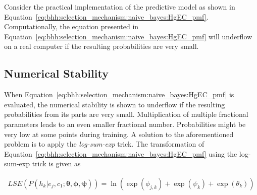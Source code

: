 \documentclass[preprint,review,12pt]{elsarticle}
\begin{document}
Consider the practical implementation of the predictive model as shown in Equation~\eqref{eq:bhh:selection_mechanism:naive_bayes:HgEC_pmf}. Computationally, the equation presented in Equation~\eqref{eq:bhh:selection_mechanism:naive_bayes:HgEC_pmf} will underflow on a real computer if the resulting probabilities are very small.

\subsection{Numerical Stability}\label{sec:bhh:selection_mechanism:numerical_stability}

When Equation~\eqref{eq:bhh:selection_mechanism:naive_bayes:HgEC_pmf} is evaluated, the numerical stability is shown to underflow if the resulting probabilities from its parts are very small. Multiplication of multiple fractional parameters leads to an even smaller fractional number. Probabilities might be very low at some points during training. A solution to the aforementioned problem is to apply the \textit{log-sum-exp} trick. The transformation of Equation~\eqref{eq:bhh:selection_mechanism:naive_bayes:HgEC_pmf} using the log-sum-exp trick is given as

\begin{equation}
	\label{eq:bhh:selection_mechanism:numerical_stability:log_sum_exp}
	\begin{split}
		LSE(P(h_{k} \vert e_{j}, c_{1};  \boldsymbol{\theta}, \boldsymbol{\phi}, \boldsymbol{\psi})) = \ln(\exp(\phi_{j,k}) +  \exp(\psi_{k}) + \exp(\theta_{k}))
	\end{split}
\end{equation}



\end{document}
